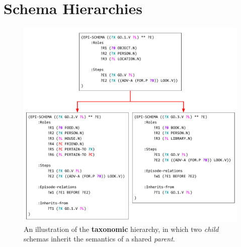\section{Schema Hierarchies}

\begin{figure}
    \centering
    \includegraphics[width=\columnwidth]{CH3_schemas/inheritance}
    \caption{An illustration of the \textbf{taxonomic} hierarchy, in which two \textit{child} schemas inherit the semantics of a shared \textit{parent}.}
    \label{fig:spec_hier}
\end{figure}

